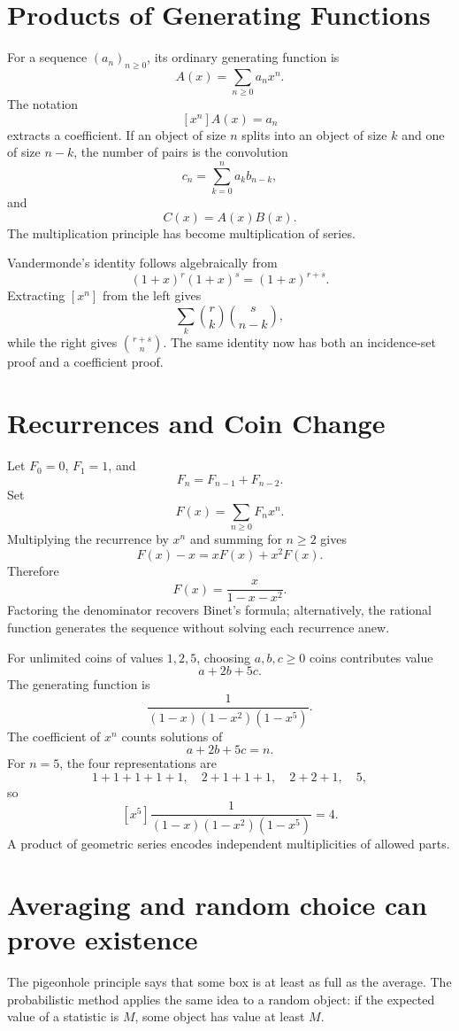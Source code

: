 \section{Products of Generating Functions}

For a sequence \((a_n)_{n\ge0}\), its ordinary generating function is
\[
  A(x)=\sum_{n\ge0}a_nx^n.
\]
The notation
\[
  [x^n]A(x)=a_n
\]
extracts a coefficient.  If an object of size \(n\) splits into an object of size \(k\) and one of size \(n-k\), the number of pairs is the convolution
\[
  c_n=\sum_{k=0}^n a_kb_{n-k},
\]
and
\[
  C(x)=A(x)B(x).
\]
The multiplication principle has become multiplication of series.

Vandermonde's identity follows algebraically from
\[
  (1+x)^r(1+x)^s=(1+x)^{r+s}.
\]
Extracting \([x^n]\) from the left gives
\[
  \sum_k\binom rk\binom s{n-k},
\]
while the right gives \(\binom{r+s}n\).  The same identity now has both an incidence-set proof and a coefficient proof.

\section{Recurrences and Coin Change}

Let \(F_0=0\), \(F_1=1\), and
\[
  F_n=F_{n-1}+F_{n-2}.
\]
Set
\[
  F(x)=\sum_{n\ge0}F_nx^n.
\]
Multiplying the recurrence by \(x^n\) and summing for \(n\ge2\) gives
\[
  F(x)-x=xF(x)+x^2F(x).
\]
Therefore
\[
  \boxed{
  F(x)=\frac{x}{1-x-x^2}.}
\]
Factoring the denominator recovers Binet's formula; alternatively, the rational function generates the sequence without solving each recurrence anew.

For unlimited coins of values \(1,2,5\), choosing \(a,b,c\ge0\) coins contributes value
\[
  a+2b+5c.
\]
The generating function is
\[
  \frac1{(1-x)(1-x^2)(1-x^5)}.
\]
The coefficient of \(x^n\) counts solutions of
\[
  a+2b+5c=n.
\]
For \(n=5\), the four representations are
\[
  1+1+1+1+1,
  \quad
  2+1+1+1,
  \quad
  2+2+1,
  \quad
  5,
\]
so
\[
  [x^5]\frac1{(1-x)(1-x^2)(1-x^5)}=4.
\]
A product of geometric series encodes independent multiplicities of allowed parts.

\section{Averaging and random choice can prove existence}

The pigeonhole principle says that some box is at least as full as the average.  The probabilistic method applies the same idea to a random object: if the expected value of a statistic is \(M\), some object has value at least \(M\).

